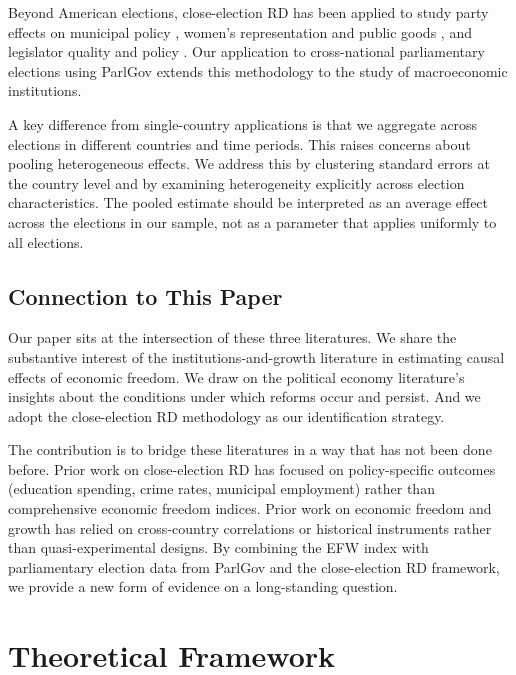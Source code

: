 \documentclass[12pt,a4paper]{article}
\begin{document}
Beyond American elections, close-election RD has been applied to study 
party effects on municipal policy \citep{ferreira2009votes, pettersson2008parties}, 
women's representation and public goods \citep{clots2012women, 
bhalotra2014health}, and legislator quality and policy \citep{hall2015does, 
besley2017gender}. Our application to cross-national parliamentary 
elections using ParlGov extends this methodology to the study of 
macroeconomic institutions.

A key difference from single-country applications is that we aggregate 
across elections in different countries and time periods. This raises 
concerns about pooling heterogeneous effects. We address this by 
clustering standard errors at the country level and by examining 
heterogeneity explicitly across election characteristics. The pooled 
estimate should be interpreted as an average effect across the elections 
in our sample, not as a parameter that applies uniformly to all elections.

\subsection{Connection to This Paper}

Our paper sits at the intersection of these three literatures. We share 
the substantive interest of the institutions-and-growth literature in 
estimating causal effects of economic freedom. We draw on the political 
economy literature's insights about the conditions under which reforms 
occur and persist. And we adopt the close-election RD methodology as 
our identification strategy.

The contribution is to bridge these literatures in a way that has not 
been done before. Prior work on close-election RD has focused on 
policy-specific outcomes (education spending, crime rates, municipal 
employment) rather than comprehensive economic freedom indices. Prior 
work on economic freedom and growth has relied on cross-country 
correlations or historical instruments rather than quasi-experimental 
designs. By combining the EFW index with parliamentary election data 
from ParlGov and the close-election RD framework, we provide a new 
form of evidence on a long-standing question.


\section{Theoretical Framework}
\label{sec:theory}
\end{document}
